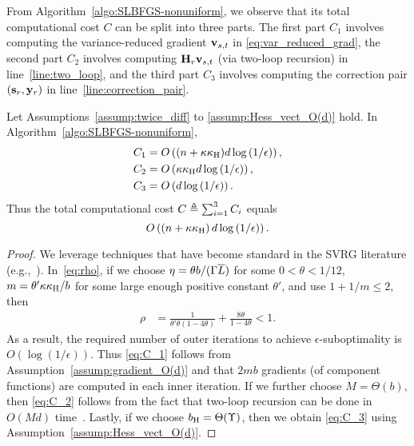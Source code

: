 \documentclass[10pt,twocolumn,journal]{IEEEtran}
\begin{document}
From Algorithm~\ref{algo:SLBFGS-nonuniform}, we observe that its total computational cost $C$ can be split into three parts. The first part $C_1$ involves computing the variance-reduced gradient $\mathbf{v}_{s,t}$ in \eqref{eq:var_reduced_grad}, the second part $C_2$ involves computing $\mathbf{H}_r\mathbf{v}_{s,t}$ (via two-loop recursion) in line~\ref{line:two_loop}, and the third part $C_3$ involves computing the correction pair $(\mathbf{s}_r,\mathbf{y}_r)$ in line~\ref{line:correction_pair}. %

\begin{prop}\label{prop:comp}
Let Assumptions~\ref{assump:twice_diff} to \ref{assump:Hess_vect_O(d)} hold. In Algorithm~\ref{algo:SLBFGS-nonuniform}, %
\begin{align}
C_1 &= O\left((n+\kappa\kappa_{\mathrm{H}})d\log\left(1/\epsilon\right)\right),\label{eq:C_1}\\
C_2 &= O\left(\kappa\kappa_{\mathrm{H}} d\log\left(1/\epsilon\right)\right),\label{eq:C_2}\\
C_3 &= O\left(d\log\left(1/\epsilon\right)\right).\label{eq:C_3}
\end{align}
Thus the total computational cost $C\triangleq \sum_{i=1}^3 C_i$ equals
\begin{equation}
 O\left(\left(n+\kappa\kappa_{\mathrm{H}}\right)d\log\left(1/\epsilon\right)\right).\label{eq:C}
\end{equation}
\end{prop}
\begin{proof}
{We leverage techniques} that have become standard in the SVRG literature (e.g.,~\cite{Xiao_14}). In~\eqref{eq:rho}, if we choose $\eta = \theta b/(\Gamma\overline{L})$ for some $0<\theta<1/12$, $m = \theta'\kappa\kappa_{\mathrm{H}}/b$ for some large enough positive constant $\theta'$, and use $1+1/m\le 2$, 
then %
\begin{align}
\rho %
&= \frac{1}{\theta'\theta(1-4\theta)}+\frac{8\theta}{1-4\theta}<1.
\end{align}
As a result, the required number of outer iterations to achieve $\epsilon$-suboptimality is $O(\log(1/\epsilon))$. Thus \eqref{eq:C_1} follows from Assumption~\ref{assump:gradient_O(d)} and that $2mb$ gradients (of component functions) are computed in each inner iteration. If we further choose $M=\Theta(b)$, then \eqref{eq:C_2} follows from the fact that two-loop recursion can be done in $O(Md)$ time~\cite[Chapter~7]{Nocedal_06}. Lastly, if we choose $b_{\mathrm{H}}=\Theta(\Upsilon)$, then we obtain \eqref{eq:C_3} using Assumption~\ref{assump:Hess_vect_O(d)}. 
\end{proof}
\end{document}

